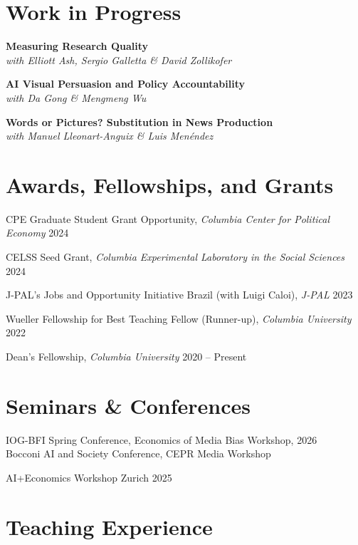 \documentclass[10pt,letterpaper]{article}
\begin{document}
\section*{Work in Progress}

\textbf{Measuring Research Quality}\\
\textit{with Elliott Ash, Sergio Galletta \& David Zollikofer}

\medskip

\textbf{AI Visual Persuasion and Policy Accountability}\\
\textit{with Da Gong \& Mengmeng Wu}

\medskip

\textbf{Words or Pictures? Substitution in News Production}\\
\textit{with Manuel Lleonart-Anguix \& Luis Men\'endez}

\newpage

\section*{Awards, Fellowships, and Grants}

CPE Graduate Student Grant Opportunity, \textit{Columbia Center for Political Economy}  \hfill 2024

\smallskip

CELSS Seed Grant, \textit{Columbia Experimental Laboratory in the Social Sciences}  \hfill 2024

\smallskip

J-PAL's Jobs and Opportunity Initiative Brazil (with Luigi Caloi), \textit{J-PAL} \hfill 2023

\smallskip

Wueller Fellowship for Best Teaching Fellow (Runner-up), \textit{Columbia University} \hfill 2022

\smallskip

Dean's Fellowship, \textit{Columbia University} \hfill 2020 – Present

\section*{Seminars \& Conferences}
IOG-BFI Spring Conference, Economics of Media Bias Workshop, \hfill 2026\\
Bocconi AI and Society Conference, CEPR Media Workshop

\smallskip

AI+Economics Workshop Zurich \hfill 2025


\section*{Teaching Experience}
\end{document}
